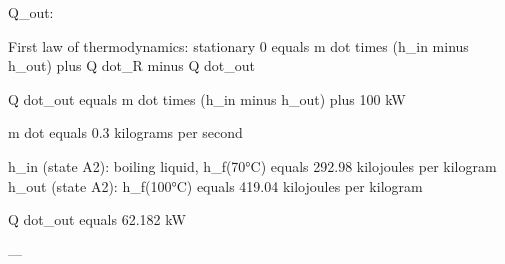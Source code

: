 Q_out:  

First law of thermodynamics: stationary  
0 equals m dot times (h_in minus h_out) plus Q dot_R minus Q dot_out  

Q dot_out equals m dot times (h_in minus h_out) plus 100 kW  

m dot equals 0.3 kilograms per second  

h_in (state A2): boiling liquid, h_f(70°C) equals 292.98 kilojoules per kilogram  
h_out (state A2): h_f(100°C) equals 419.04 kilojoules per kilogram  

Q dot_out equals 62.182 kW  

---